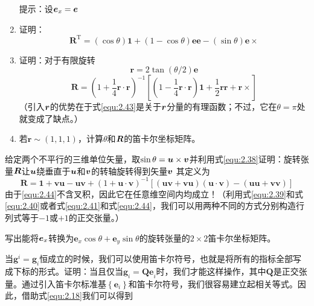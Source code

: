 \begin{exercise}
\begin{enumerate}
        提示：设$\boldsymbol{e}_x=\boldsymbol{e}$
        \item 证明：
        \begin{equation*}
            \boldsymbol{R}^{\mathrm{T}}=\left( \cos \theta \right) \mathbf{1}+\left( 1-\cos \theta \right) \boldsymbol{ee}-\left( \sin \theta \right) \boldsymbol{e}\times 
        \end{equation*}
        \item 证明：对于有限旋转
        \begin{equation}\label{equ:2.42}
                \boldsymbol{r}=2\tan \left( \theta /2 \right) \boldsymbol{e}
        \end{equation}
        \begin{equation}
            \boldsymbol{R}=\left( 1+\frac{1}{4}\boldsymbol{r}\cdot \boldsymbol{r} \right) ^{-1}\left[ \left( 1-\frac{1}{4}\boldsymbol{r}\cdot \boldsymbol{r} \right) \mathbf{1}+\frac{1}{2}\boldsymbol{rr}+\boldsymbol{r}\times \right] \label{equ:2.43}
        \end{equation}
        （引入$\boldsymbol{r}$的优势在于式\eqref{equ:2.43}是关于$\boldsymbol{r}$分量的有理函数；不过，它在$\theta = \pi$处就变成了缺点。）
        \item 若$\boldsymbol{r}\sim \left( 1,1,1 \right) $，计算$\theta $和$\boldsymbol{R}$的笛卡尔坐标矩阵。
    \end{enumerate}
    \item 给定两个不平行的三维单位矢量，取$\sin \theta =\boldsymbol{u}\times \boldsymbol{v}$并利用式\eqref{equ:2.38}证明：旋转张量$\boldsymbol{R}$让$\boldsymbol{u}$绕垂直于$\boldsymbol{u}$和$\boldsymbol{v}$的转轴旋转得到矢量$\boldsymbol{v}$
    其定义为
    \begin{equation}\label{equ:2.44}
        \boldsymbol{R}=\mathbf{1}+\boldsymbol{vu}-\boldsymbol{uv}+\left( 1+\boldsymbol{u}\cdot \boldsymbol{v} \right) ^{-1}\left[ \left( \boldsymbol{uv}+\boldsymbol{vu} \right) \left( \boldsymbol{u}\cdot \boldsymbol{v} \right) -\left( \boldsymbol{uu}+\boldsymbol{vv} \right) \right] 
    \end{equation}
    由于\eqref{equ:2.44}不含叉积，因此它在任意维空间内均成立！（利用式\eqref{equ:2.39}和式\eqref{equ:2.40}或者式\eqref{equ:2.41}和式\eqref{equ:2.44}，我们可以用两种不同的方式分别构造行列式等于$-1$或$+1$的正交张量。）
    \item 写出能将$\boldsymbol{e}_x$转换为$\boldsymbol{e}_x\cos \theta +\boldsymbol{e}_y\sin \theta $的旋转张量的$2\times 2$笛卡尔坐标矩阵。\
    \item 当$\boldsymbol{g}^i=\boldsymbol{g}_i$恒成立的时候，我们可以使用笛卡尔符号，也就是将所有的指标全部写成下标的形式。证明：当且仅当$\boldsymbol{g}_i=\boldsymbol{Qe}_i$时，我们才能这样操作，其中$\boldsymbol{Q}$是正交张量。通过引入笛卡尔标准基$\left\{ \boldsymbol{e}_i \right\} $和笛卡尔符号，我们很容易建立起相关等式。因此，借助式\eqref{equ:2.18}我们可以得到

\end{exercise}

